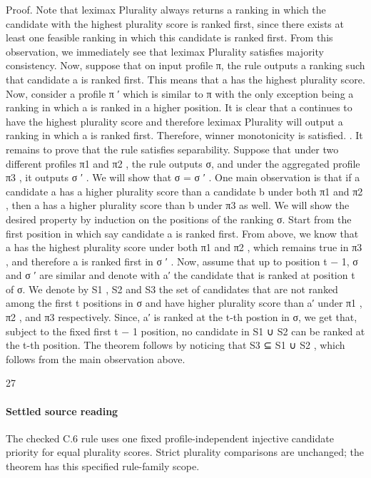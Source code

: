 \documentclass[10pt]{article}
\begin{document}
\begin{ReviewVerbatim}
Proof. Note that leximax Plurality always returns a ranking in which the candidate with the highest
plurality score is ranked first, since there exists at least one feasible ranking in which this candidate
is ranked first. From this observation, we immediately see that leximax Plurality satisfies majority
consistency.
Now, suppose that on input profile π, the rule outputs a ranking such that candidate a is ranked first.
This means that a has the highest plurality score. Now, consider a profile π ′ which is similar to π
with the only exception being a ranking in which a is ranked in a higher position. It is clear that a
continues to have the highest plurality score and therefore leximax Plurality will output a ranking in
which a is ranked first. Therefore, winner monotonicity is satisfied. .
It remains to prove that the rule satisfies separability. Suppose that under two different profiles π1
and π2 , the rule outputs σ, and under the aggregated profile π3 , it outputs σ ′ . We will show that
σ = σ ′ . One main observation is that if a candidate a has a higher plurality score than a candidate b
under both π1 and π2 , then a has a higher plurality score than b under π3 as well. We will show the
desired property by induction on the positions of the ranking σ. Start from the first position in which
say candidate a is ranked first. From above, we know that a has the highest plurality score under
both π1 and π2 , which remains true in π3 , and therefore a is ranked first in σ ′ . Now, assume that up
to position t − 1, σ and σ ′ are similar and denote with a′ the candidate that is ranked at position t of
σ. We denote by S1 , S2 and S3 the set of candidates that are not ranked among the first t positions
in σ and have higher plurality score than a′ under π1 , π2 , and π3 respectively. Since, a′ is ranked at
the t-th postion in σ, we get that, subject to the fixed first t − 1 position, no candidate in S1 ∪ S2 can
be ranked at the t-th position. The theorem follows by noticing that S3 ⊆ S1 ∪ S2 , which follows
from the main observation above.




                                                   27
\end{ReviewVerbatim}

\paragraph{Settled source reading}
\begin{sloppypar}
The checked C.\allowbreak{}6 rule uses one fixed profile-\allowbreak{}independent injective candidate priority for equal plurality scores.\allowbreak{} Strict plurality comparisons are unchanged;\allowbreak{} the theorem has this specified rule-\allowbreak{}family scope.\allowbreak{}
\end{sloppypar}
\end{document}
